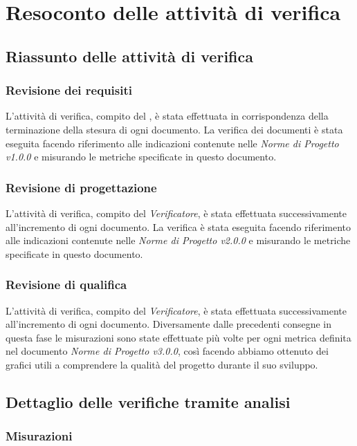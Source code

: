\section{Resoconto delle attività di verifica}
	\subsection{Riassunto delle attività di verifica}
	\subsubsection{Revisione dei requisiti}
	L'attività di verifica, compito del \emph{}, è stata effettuata in corrispondenza della terminazione della stesura di ogni documento. La verifica dei documenti è stata eseguita facendo riferimento alle indicazioni contenute nelle \emph{Norme di Progetto v1.0.0} e misurando le metriche specificate in questo documento.
	\subsubsection{Revisione di progettazione}
	L'attività di verifica, compito del \emph{Verificatore}, è stata effettuata successivamente all'incremento di ogni documento. La verifica è stata eseguita facendo riferimento alle indicazioni contenute nelle \emph{Norme di Progetto v2.0.0} e misurando le metriche specificate in questo documento.
	\subsubsection{Revisione di qualifica}
	L'attività di verifica, compito  del \emph{Verificatore}, è stata effettuata successivamente all'incremento di ogni documento.
	Diversamente dalle precedenti consegne in questa fase le misurazioni sono state effettuate più volte per ogni metrica definita nel documento \emph{Norme di Progetto v3.0.0}, così facendo abbiamo ottenuto dei grafici utili a comprendere la qualità del progetto durante il suo sviluppo.
	
	\subsection{Dettaglio delle verifiche tramite analisi}
	\subsubsection{Misurazioni}
